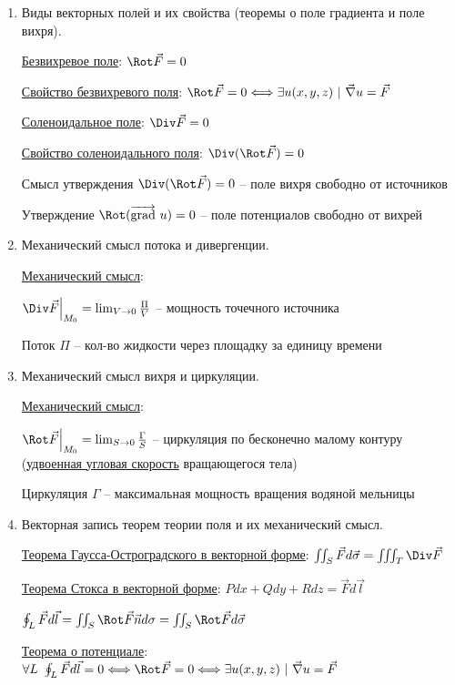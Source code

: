 \documentclass[12pt]{article}
\begin{document}
\begin{enumerate}
        \item Виды векторных полей и их свойства (теоремы о поле градиента и поле вихря).

        \hyperlink{vectorfieldtypes}{Безвихревое поле}: $\Rot \vec{F} = 0$

        \hyperlink{irrotationalfieldproperty}{Свойство безвихревого поля}: $\Rot \vec{F} = 0 \Longleftrightarrow \exists u(x, y, z) \ | \ \vec\nabla u = \vec{F}$

        \hyperlink{vectorfieldtypes}{Соленоидальное поле}: $\Div \vec{F} = 0$

        \hyperlink{solenoidalfieldproperty}{Свойство соленоидального поля}: $\Div (\Rot \vec{F}) = 0$

        Смысл утверждения $\Div (\Rot \vec F) = 0$ -- поле вихря свободно от источников

        Утверждение $\Rot (\overrightarrow{\operatorname{grad}}\ u) = 0$ -- поле потенциалов свободно от вихрей


        \item Механический смысл потока и дивергенции.

        \hyperlink{divergencemechanicalmeaning}{Механический смысл}:

        $\Div \vec{F} \Big|_{M_0} = \lim_{V \to 0} \frac{\Pi}{V}$ -- мощность точечного источника

        Поток $\Pi$ -- кол-во жидкости через площадку за единицу времени


        \item Механический смысл вихря и циркуляции.

        \hyperlink{rotormechanicalmeaning}{Механический смысл}:

        $\Rot \vec{F} \Big|_{M_0} = \lim_{S \to 0} \frac{\Gamma}{S}$ -- циркуляция по бесконечно малому контуру (\hyperlink{rotormechanicalmeaning2}{удвоенная угловая скорость} вращающегося тела)

        Циркуляция $\Gamma$ -- максимальная мощность вращения водяной мельницы

        \item Векторная запись теорем теории поля и их механический смысл.

        \hyperlink{theoremGaussOstrogradskyyinvectorform}{Теорема Гаусса-Остроградского в векторной форме}: $\iint_S \vec{F} d\vec{\sigma} = \iiint_T \Div \vec{F}$

        \hyperlink{theoremStokesinvectorform}{Теорема Стокса в векторной форме}: $Pdx + Qdy + Rdz = \vec{F}d\vec{l}$

        $\oint_L \vec{F}d\vec{l} = \iint_S \Rot \vec{F} \vec{n} d\sigma = \iint_S \Rot \vec{F} d\vec{\sigma}$

        \hyperlink{theoremaboutpotentialinvectorform}{Теорема о потенциале}: $\forall L \ \oint_L \vec{F}d\vec{l} = 0 \Longleftrightarrow \Rot \vec{F} = 0 \Longleftrightarrow \exists u(x, y, z) \ | \ \vec\nabla u = \vec{F}$


    \end{enumerate}
\end{document}
